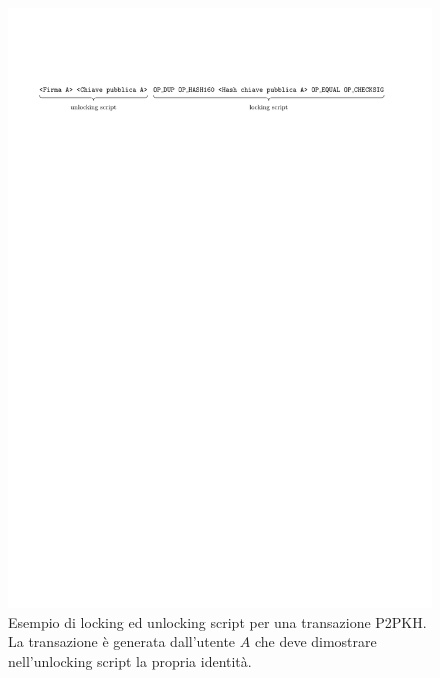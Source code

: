 \begin{figure}[]
	\centering
	\includegraphics[scale=0.78]{img/capuno/p2pkh.pdf}
	\caption{Esempio di locking ed unlocking script per una transazione P2PKH. La transazione è generata dall'utente $A$ che deve dimostrare nell'unlocking script la propria identità.}
	\label{fig:p2pkh}
\end{figure}


